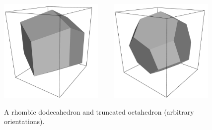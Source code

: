 \begin{figure}
\centerline{
\includegraphics[width=5cm]{plots/rhododec}
~~~~\includegraphics[width=5cm]{plots/truncoct}
}
\caption {A rhombic dodecahedron and truncated octahedron
(arbitrary orientations).}
\label{fig:boxshapes}
\end{figure}

